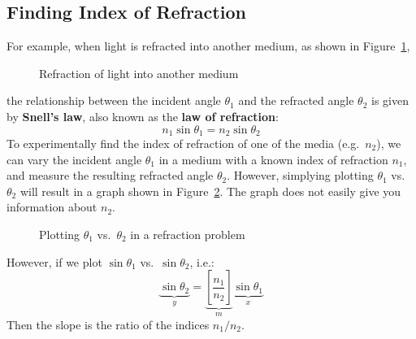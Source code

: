\subsection{Finding Index of Refraction}
For example, when light is refracted into another medium, as shown in
Figure~\ref{fig:snell},
\begin{figure}[ht]
  \centering
  \caption{Refraction of light into another medium}
  \label{fig:snell}
\end{figure}
the relationship between the incident angle $\theta_1$ and the refracted angle
$\theta_2$ is given by \textbf{Snell's law}, also known as the
\textbf{law of refraction}:
\begin{equation}
  n_1\sin\theta_1=n_2\sin\theta_2
\end{equation}
To experimentally find the index of refraction of one of the media (e.g.\
$n_2$), we can vary the incident angle $\theta_1$ in a medium with a known
index of refraction $n_1$, and measure the resulting refracted angle $\theta_2$.
However, simplying plotting $\theta_1$ vs.\ $\theta_2$ will result in a graph
shown in Figure~\ref{fig:snell2}. The graph does not easily give you
information about $n_2$.
\begin{figure}
  \centering
  \caption{Plotting $\theta_1$ vs.\ $\theta_2$ in a refraction problem}
  \label{fig:snell2}
\end{figure}
However, if we plot $\sin\theta_1$ vs.\ $\sin\theta_2$, i.e.:
\begin{equation*}
  \underbrace{\sin\theta_2}_y=\underbrace{\left[\frac{n_1}{n_2}\right]}_m
  \underbrace{\sin\theta_1}_x
\end{equation*}
Then the slope is the ratio of the indices $n_1/n_2$.

